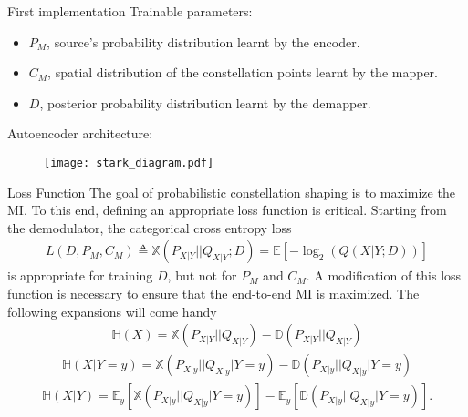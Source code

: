 \documentclass[english,aspectratio=1610,9pt,helvet,nicetitles]{ICEbeamerTUMCD}
\begin{document}
\begin{frame}{First implementation \cite{Stark}}
	Trainable parameters:
	\vspace{-5mm}
	\begin{itemize}
		\item $P_M$, source's probability distribution learnt by the encoder.
		\item $C_M$, spatial distribution of the constellation points learnt by the mapper.
		\item $D$, posterior probability distribution learnt by the demapper.
	\end{itemize}
	\vspace{-5mm}
	Autoencoder architecture:
	\begin{figure}
		\centering
		\texttt{[image: stark\_diagram.pdf]}
		\label{fig:starkAe}
	\end{figure}
\end{frame}

\begin{frame}{Loss Function}
	The goal of probabilistic constellation shaping is to maximize the MI. To this end, defining an appropriate loss function is critical. Starting from the demodulator, the categorical cross entropy loss
\begin{align}
	L(D, P_M, C_M) \triangleq \mathbb{X}(P_{X|Y}||Q_{X|Y}; D) = \mathbb{E}\left[-\log_2(Q(X|Y;D))\right] 
\end{align}
is appropriate for training $D$, but not for $P_M$ and $C_M$. A modification of this loss function is necessary to ensure that the end-to-end MI is maximized. The following expansions will come handy
\begin{align}
	\mathbb{H}(X) = \mathbb{X}(P_{X|Y}||Q_{X|Y}) - \mathbb{D}(P_{X|Y}||Q_{X|Y})
\end{align}
\begin{align}
	\mathbb{H}(X|Y=y) = \mathbb{X}(P_{X|y}||Q_{X|y}|Y=y) - \mathbb{D}(P_{X|y}||Q_{X|y}|Y=y)
\end{align}
\begin{align}
	\mathbb{H}(X|Y) = \mathbb{E}_y\left[\mathbb{X}(P_{X|y}||Q_{X|y}|Y=y)\right] - \mathbb{E}_y \left[\mathbb{D}(P_{X|y}||Q_{X|y}|Y=y)\right].
\end{align}
\end{frame}
\end{document}
